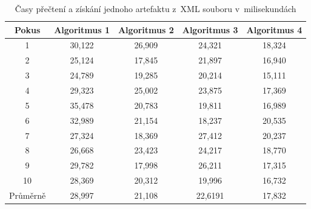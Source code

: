 \documentclass[czech,master]{diploma}
\begin{document}
\begin{table}[htp]
\centering
\begin{tabular}{@{}ccccc@{}}
\toprule
\textbf{Pokus} & \textbf{Algoritmus 1} & \textbf{Algoritmus 2} & \textbf{Algoritmus 3} & \textbf{Algoritmus 4} \\ \midrule
1                 & 30,122                & 26,909                & 24,321                & 18,324                \\
2                 & 25,124                & 17,845                & 21,897                & 16,940                \\
3                 & 24,789                & 19,285                & 20,214                & 15,111                \\
4                 & 29,323                & 25,002                & 23,875                & 17,369                \\
5                 & 35,478                & 20,783                & 19,811                & 16,989                \\
6                 & 32,989                & 21,154                & 18,237                & 20,535                \\
7                 & 27,324                & 18,369                & 27,412                & 20,237                \\
8                 & 26,668                & 23,423                & 24,217                & 18,770                \\
9                 & 29,782                & 17,998                & 26,211                & 17,315                \\
10                & 28,369                & 20,312                & 19,996                & 16,732                \\ \midrule
Průměrně          & 28,997               & 21,108                & 22,6191               & 17,832                \\ \bottomrule
\end{tabular}
\caption{Časy přečtení a získání jednoho artefaktu z~XML souboru v~milisekundách}
\label{tab:xml_read}
\end{table}
\end{document}
